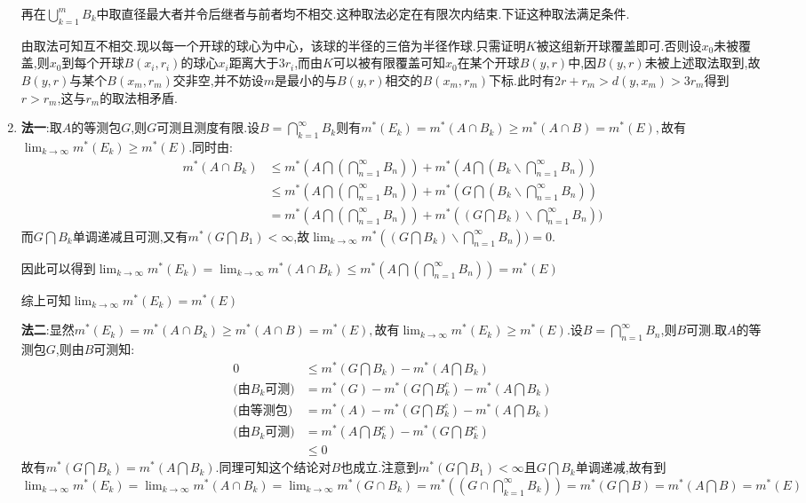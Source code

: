 \documentclass[UTF8, a4paper, 12pt, oneside, onecolumn]{article}
\numberwithin{equation}{section}
\numberwithin{figure}{section}
\numberwithin{table}{section}
\theoremstyle{nonumberplain}	%
\theoremstyle{plain}	%
\theoremstyle{plain}	%
\theoremstyle{plain}	%
\theoremstyle{plain}	%
\theoremstyle{nonumberplain}
\begin{document}
\begin{enumerate}
	再在$\displaystyle\bigcup_{k=1}^{m}B_k$中取直径最大者并令后继者与前者均不相交.这种取法必定在有限次内结束.下证这种取法满足条件.
	
	由取法可知互不相交.现以每一个开球的球心为中心，该球的半径的三倍为半径作球.只需证明$K$被这组新开球覆盖即可.否则设$x_0$未被覆盖,则$x_0$到每个开球$B(x_i,r_i)$的球心$x_i$距离大于$3r_i$,而由$K$可以被有限覆盖可知$x_0$在某个开球$B(y,r)$中,因$B(y,r)$未被上述取法取到,故$B(y,r)$与某个$B(x_m,r_m)$交非空,并不妨设$m$是最小的与$B(y,r)$相交的$B(x_m,r_m)$下标.此时有$2r+r_m>d(y,x_m)>3r_m$得到$r>r_m$,这与$r_m$的取法相矛盾.
	
	
	
	
	
	\item 
	{\bf 法一}:取$A$的等测包$G$,则$G$可测且测度有限.设$\displaystyle B=\bigcap_{k=1}^{\infty}B_k$则有$\displaystyle m^*(E_k)=m^*(A\cap B_k)\geqslant m^*(A\cap B)=m^*(E),$故有$\displaystyle\lim_{k\rightarrow \infty}m^*(E_k)\geqslant m^*(E)$.同时由:
	\begin{align*}
	m^*(A\cap B_k)&\leqslant m^*(A\bigcap(\bigcap_{n=1}^{\infty}B_n))+m^*(A\bigcap(B_k\backslash \bigcap_{n=1}^{\infty}B_n))\\
	&\leqslant m^*(A\bigcap(\bigcap_{n=1}^{\infty}B_n))+m^*(G\bigcap(B_k\backslash \bigcap_{n=1}^{\infty}B_n))\\
	&= m^*(A\bigcap(\bigcap_{n=1}^{\infty}B_n))+m^*((G\bigcap B_k)\backslash \bigcap_{n=1}^{\infty}B_n))
	\end{align*}
	而$G\bigcap B_k$单调递减且可测,又有$\displaystyle m^*(G\bigcap B_1)<\infty$,故$\displaystyle \lim_{k\rightarrow \infty}m^*((G\bigcap B_k)\backslash \bigcap_{n=1}^{\infty}B_n))=0$.
	
	因此可以得到$\displaystyle\lim_{k\rightarrow \infty}m^*(E_k)=\lim_{k\rightarrow \infty}m^*(A\cap B_k)\leqslant m^*(A\bigcap(\bigcap_{n=1}^{\infty}B_n))=m^*(E)$
	
	综上可知$\displaystyle\lim_{k\rightarrow \infty}m^*(E_k)=m^*(E)$
	
	{\bf 法二}:显然$\displaystyle m^*(E_k)=m^*(A\cap B_k)\geqslant m^*(A\cap B)=m^*(E),$故有$\displaystyle\lim_{k\rightarrow \infty}m^*(E_k)\geqslant m^*(E)$.设$\displaystyle B=\bigcap_{n=1}^{\infty}B_n$,则$B$可测.取$A$的等测包$G$,则由$B$可测知:
	\begin{align*}
	0&\leqslant m^*(G\bigcap B_k)-m^*(A\bigcap B_k)\\
	\text{(由$B_k$可测)}&=m^*(G)-m^*(G\bigcap B_k^c)-m^*(A\bigcap B_k) \\
	\text{(由等测包)}&=m^*(A)-m^*(G\bigcap B_k^c)-m^*(A\bigcap B_k) \\
	\text{(由$B_k$可测)}&= m^*(A\bigcap B_k^c)-m^*(G\bigcap B_k^c)\\
	&\leqslant 0
	\end{align*}
	故有$m^*(G\bigcap B_k)=m^*(A\bigcap B_k)$.同理可知这个结论对$B$也成立.注意到$m^*(G\bigcap B_1)<\infty$且$G\bigcap B_k$单调递减,故有到$\displaystyle\lim_{k\rightarrow \infty}m^*(E_k)=\lim_{k\rightarrow \infty}m^*(A\cap B_k)=\lim_{k\rightarrow \infty}m^*(G\cap B_k)=m^*((G\cap \bigcap_{k=1}^{\infty}B_k))=m^*(G\bigcap B)=m^*(A\bigcap B)=m^*(E)$
	

\end{enumerate}
\end{document}
